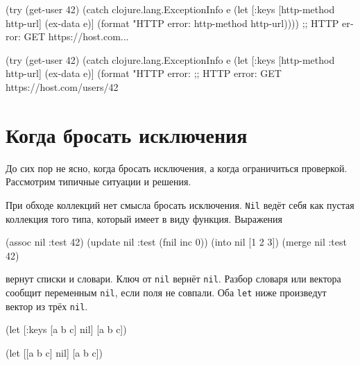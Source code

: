 \begin{english}
  \begin{clojure}
(try
  (get-user 42)
  (catch clojure.lang.ExceptionInfo e
    (let [{:keys [http-method http-url]}
          (ex-data e)]
      (format "HTTP error: %
        http-method http-url))))
;; HTTP error: GET https://host.com...
  \end{clojure}
\end{english}

\else

\begin{english}
  \begin{clojure}
(try
  (get-user 42)
  (catch clojure.lang.ExceptionInfo e
    (let [{:keys [http-method http-url]} (ex-data e)]
      (format "HTTP error: %
;; HTTP error: GET https://host.com/users/42
  \end{clojure}
\end{english}

\fi

\section{Когда бросать исключения}

До сих пор не ясно, когда бросать исключения, а когда ограничиться
проверкой. Рассмотрим типичные ситуации и решения.

При обходе коллекций нет смысла бросать исключения. \verb|Nil| ведёт себя как
пустая коллекция того типа, который имеет в виду функция. Выражения

\begin{english}
  \begin{clojure}
(assoc nil :test 42)
(update nil :test (fnil inc 0))
(into nil [1 2 3])
(merge nil {:test 42})
  \end{clojure}
\end{english}

\noindent
вернут списки и словари. Ключ от \verb|nil| вернёт \verb|nil|. Разбор
словаря или вектора сообщит переменным \verb|nil|, если поля не совпали. Оба
\verb|let| ниже произведут вектор из трёх \verb|nil|.

\ifx\DEVICETYPE\MOBILE

\begin{english}
  \begin{clojure}
(let [{:keys [a b c]} nil]
  [a b c])
  \end{clojure}

\splitter

  \begin{clojure}
(let [[a b c] nil]
  [a b c])
  \end{clojure}
\end{english}

